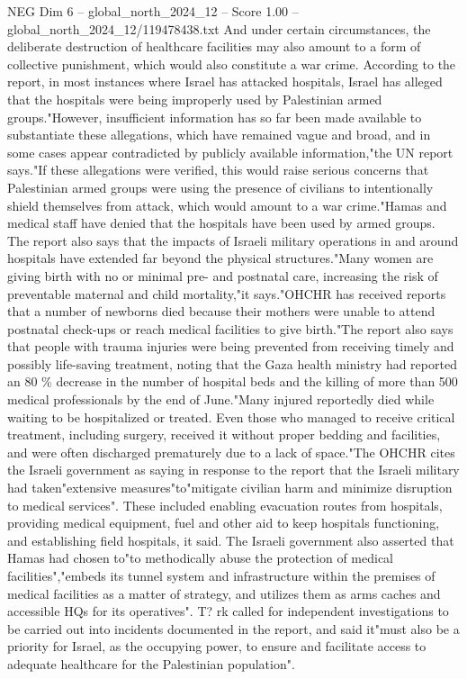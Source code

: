 \begin{textsample}{NEG Dim 6 – global\_north\_2024\_12 – Score 1.00 – global\_north\_2024\_12/119478438.txt}
And under certain circumstances, the deliberate destruction of healthcare facilities may also amount to a form of collective punishment, which would also constitute a war crime.
According to the report, in most instances where Israel has attacked hospitals, Israel has alleged that the hospitals were being improperly used by Palestinian armed groups."However, insufficient information has so far been made available to substantiate these allegations, which have remained vague and broad, and in some cases appear contradicted by publicly available information,"the UN report says."If these allegations were verified, this would raise serious concerns that Palestinian armed groups were using the presence of civilians to intentionally shield themselves from attack, which would amount to a war crime."Hamas and medical staff have denied that the hospitals have been used by armed groups.
The report also says that the impacts of Israeli military operations in and around hospitals have extended far beyond the physical structures."Many women are giving birth with no or minimal pre- and postnatal care, increasing the risk of preventable maternal and child mortality,"it says."OHCHR has received reports that a number of newborns died because their mothers were unable to attend postnatal check-ups or reach medical facilities to give birth."The report also says that people with trauma injuries were being prevented from receiving timely and possibly life-saving treatment, noting that the Gaza health ministry had reported an 80 \% decrease in the number of hospital beds and the killing of more than 500 medical professionals by the end of June."Many injured reportedly died while waiting to be hospitalized or treated.
Even those who managed to receive critical treatment, including surgery, received it without proper bedding and facilities, and were often discharged prematurely due to a lack of space."The OHCHR cites the Israeli government as saying in response to the report that the Israeli military had taken"extensive measures"to"mitigate civilian harm and minimize disruption to medical services".
These included enabling evacuation routes from hospitals, providing medical equipment, fuel and other aid to keep hospitals functioning, and establishing field hospitals, it said.
The Israeli government also asserted that Hamas had chosen to"to methodically abuse the protection of medical facilities","embeds its tunnel system and infrastructure within the premises of medical facilities as a matter of strategy, and utilizes them as arms caches and accessible HQs for its operatives".
T? rk called for independent investigations to be carried out into incidents documented in the report, and said it"must also be a priority for Israel, as the occupying power, to ensure and facilitate access to adequate healthcare for the Palestinian population".

\end{textsample}
